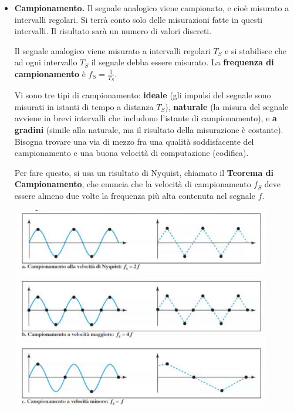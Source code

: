             \begin{itemize}
                \item 
                   \textbf{Campionamento.} Il segnale analogico viene campionato, e cioè misurato a intervalli regolari. Si terrà conto solo delle misurazioni fatte in questi intervalli. Il risultato sarà un numero di valori discreti.
                   
                   Il segnale analogico viene misurato a intervalli regolari $T_S$ e si stabilisce che ad ogni intervallo $T_S$ il segnale debba essere misurato. La \textbf{frequenza di campionamento} è \(f_S = \frac{1}{T_S}\).
                   
                   Vi sono tre tipi di campionamento: \textbf{ideale} (gli impulsi del segnale sono misurati in istanti di tempo a distanza $T_S$), \textbf{naturale} (la misura del segnale avviene in brevi intervalli che includono l'istante di campionamento), e \textbf{a gradini} (simile alla naturale, ma il risultato della misurazione è costante). Bisogna trovare una via di mezzo fra una qualità soddisfacente del campionamento e una buona velocità di computazione (codifica). 
                   
                   Per fare questo, si usa un risultato di Nyquist, chiamato il \textbf{Teorema di Campionamento}, che enuncia che la velocità di campionamento $f_S$ deve essere almeno due volte la frequenza più alta contenuta nel segnale $f$.
                   
                    \begin{center}
                        \includegraphics{images/Campionamento.png}
                    \end{center}
                

\end{itemize}
